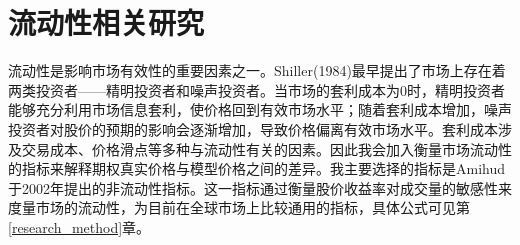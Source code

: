 \section{流动性相关研究}
\par{流动性是影响市场有效性的重要因素之一。Shiller(1984)最早提出了市场上存在着两类投资者——精明投资者和噪声投资者\cite{Rober-1984}。当市场的套利成本为0时，精明投资者能够充分利用市场信息套利，使价格回到有效市场水平；随着套利成本增加，噪声投资者对股价的预期的影响会逐渐增加，导致价格偏离有效市场水平。套利成本涉及交易成本、价格滑点等多种与流动性有关的因素。因此我会加入衡量市场流动性的指标来解释期权真实价格与模型价格之间的差异。我主要选择的指标是Amihud于2002年提出的非流动性指标\cite{Yako-2002}。这一指标通过衡量股价收益率对成交量的敏感性来度量市场的流动性，为目前在全球市场上比较通用的指标，具体公式可见第\ref{research_method}章。}
